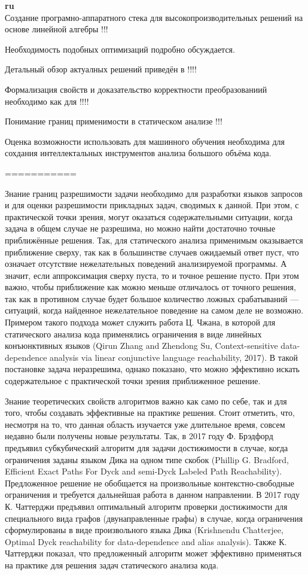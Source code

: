 \documentclass[12pt]{article}  %
\theoremstyle{remark}
\begin{document}
\textbf{ru}\\

Создание програмно-аппаратного стека для высокопроизводительных решений на основе линейной алгебры !!!

Необходимость подобных оптимизаций подробно обсуждается.

Детальный обзор актуалных решений приведён в !!!!

Формализация свойств и доказательство корректности преобразованиий необходимо как для !!!!


Понимание границ применимости в статическом анализе !!!

Оценка возможности использовать для машинного обучения необходима для сохдания интеллектальных инструментов анализа большого объёма кода.


===========



Знание границ разрешимости задачи необходимо для разработки языков запросов и для оценки разрешимости прикладных задач, сводимых к данной. При этом, с практической точки зрения, могут оказаться содержательными ситуации, когда задача в общем случае не разрешима, но можно найти достаточно точные приближённые решения. Так, для статического анализа применимым  оказывается приближение сверху, так как в большинстве случаев ожидаемый ответ пуст, что означает отсутствие нежелательных поведений анализируемой программы. А значит, если аппроксимация сверху пуста, то и точное решение пусто. При этом важно, чтобы приближение как можно меньше отличалось от точного решения, так как в противном случае будет большое количество ложных срабатываний — ситуаций, когда найденное нежелательное поведение на самом деле не возможно. Примером такого подхода может служить работа Ц. Чжана, в которой для статического анализа кода применялись ограничения в виде линейных конъюнктивных языков (Qirun Zhang and Zhendong Su, Context-sensitive data-dependence analysis via linear conjunctive language reachability, 2017). В такой постановке задача неразрешима, однако показано, что можно эффективно искать содержательное с практической точки зрения приближенное решение.

Знание теоретических свойств алгоритмов важно как само по себе, так и для того, чтобы создавать эффективные на практике решения. Стоит отметить, что, несмотря на то, что данная область изучается уже длительное время, совсем недавно были получены новые результаты. Так, в 2017 году Ф. Брэдфорд предъявил субкубический алгоритм для задачи достижимости в случае, когда ограничения заданы языком Дика на одном типе скобок (Phillip G. Bradford, Efficient Exact Paths For Dyck and semi-Dyck Labeled Path Reachability). Предложенное решение не обобщается на произвольные контекстно-свободные ограничения и требуется дальнейшая работа в данном направлении. В 2017 году К. Чаттерджи предъявил оптимальный алгоритм проверки достижимости для специального вида графов (двунаправленные графы) в случае, когда ограничения сформулированы в виде произвольного языка Дика (Krishnendu Chatterjee, Optimal Dyck reachability for data-dependence and alias analysis). Также К. Чаттерджи показал, что предложенный алгоритм может эффективно применяться на практике для решения задач статического анализа кода.
\end{document}
